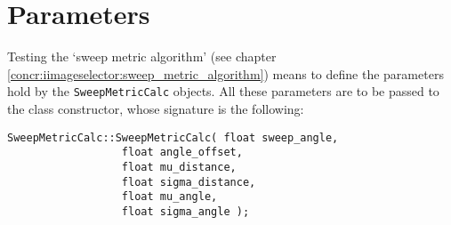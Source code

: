 \section{Parameters}
\label{performance_evaluation:parameters}

Testing the `sweep metric algorithm' (see chapter
\ref{concr:iimageselector:sweep_metric_algorithm}) means to define
the parameters hold by the \texttt{SweepMetricCalc}
objects. All these parameters are 
to be passed to the class constructor, whose signature
is the following:
\\
\begin{lstlisting}[caption={\texttt{SweepMetricCalc} class declaration},
    label={code:sweepmetriccalc}]
SweepMetricCalc::SweepMetricCalc( float sweep_angle,
				  float angle_offset,
				  float mu_distance,
				  float sigma_distance,
				  float mu_angle,
				  float sigma_angle );				  
\end{lstlisting}


